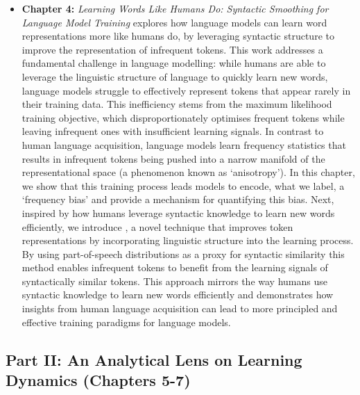\begin{itemize}
    \item \textbf{Chapter 4:} \emph{Learning Words Like Humans Do: Syntactic Smoothing for Language Model Training}  
    explores how language models can learn word representations more like humans do, by leveraging syntactic structure to improve the representation of infrequent tokens. This work addresses a fundamental challenge in language modelling: while humans are able to leverage the linguistic structure of language to quickly learn new words, language models struggle to effectively represent tokens that appear rarely in their training data. This inefficiency stems from the maximum likelihood training objective, which disproportionately optimises frequent tokens while leaving infrequent ones with insufficient learning signals. In contrast to human language acquisition, language models learn frequency statistics that results in infrequent tokens being pushed into a narrow manifold of the representational space (a phenomenon known as `anisotropy'). 
    In this chapter, we show that this training process leads models to encode, what we label, a `frequency bias' and provide a mechanism for quantifying this bias. Next, inspired by how humans leverage syntactic knowledge to learn new words efficiently, we introduce \smoothing, a novel technique that improves token representations by incorporating linguistic structure into the learning process. By using part-of-speech distributions as a proxy for syntactic similarity this method enables infrequent tokens to benefit from the learning signals of syntactically similar tokens. This approach mirrors the way humans use syntactic knowledge to learn new words efficiently and demonstrates how insights from human language acquisition can lead to more principled and effective training paradigms for language models.

\end{itemize}

\subsection*{Part II: An Analytical Lens on Learning Dynamics (Chapters 5-7)}

